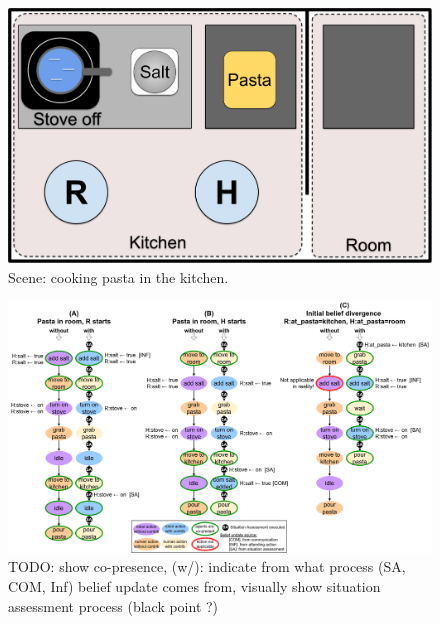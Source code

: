 \documentclass[letterpaper]{article} %
\begin{document}
\begin{figure}
    \centering
    \includegraphics[width=0.8\linewidth]{figures/scene.png}
    \caption{Scene: cooking pasta in the kitchen.}
    \label{fig:scene}
\end{figure}





\begin{figure}
    \centering
    \includegraphics[width=0.97\linewidth]{figures/example_cook.png}
    \caption{TODO: show co-presence, (w/): indicate from what process (SA, COM, Inf) belief update comes from, visually show situation assessment process (black point ?)}
    \label{fig:scenarios}
\end{figure}
\end{document}
